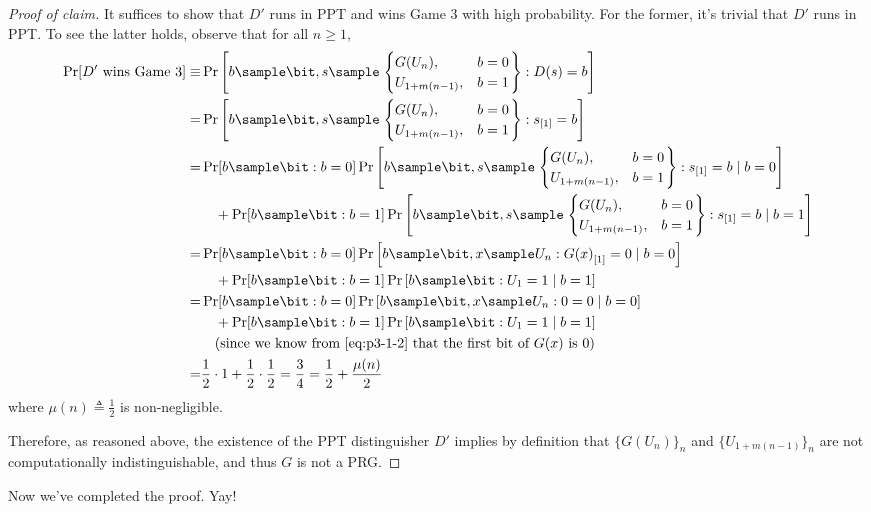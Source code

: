 \begin{answer}[i]
\begin{proof}[Proof of claim]
    It suffices to show that $D'$ runs in PPT and wins Game $3$ with high probability. For the former, it's trivial that $D'$ runs in PPT. To see the latter holds, observe that for all $n\ge 1$,
    \begin{align*}
        \Pr[D' \textrm{ wins Game } 3]
        \equiv& \Pr\left[b\sample\bit, s\sample \left.\begin{cases} 
                G(U_{n}), &b = 0 \\
                U_{1+m(n-1)}, &b = 1 
            \end{cases}\right\} : D(s)=b \right] \\
        =& \Pr\left[b\sample\bit, s\sample \left.\begin{cases} 
                G(U_{n}), &b = 0 \\
                U_{1+m(n-1)}, &b = 1 
            \end{cases}\right\} : s_{[1]}=b \right] \\
        =& \Pr[b\sample\bit: b=0] \Pr\left[b\sample\bit, s\sample \left.\begin{cases} 
                G(U_{n}), &b = 0 \\
                U_{1+m(n-1)}, &b = 1 
            \end{cases}\right\} : s_{[1]}=b \mid b=0 \right] \\
        &\quad + \Pr[b\sample\bit: b=1] \Pr\left[b\sample\bit, s\sample \left.\begin{cases} 
                G(U_{n}), &b = 0 \\
                U_{1+m(n-1)}, &b = 1 
            \end{cases}\right\} : s_{[1]}=b \mid b=1 \right] \\
        =& \Pr[b\sample\bit: b=0] \Pr\left[b\sample\bit, x\sample U_{n} : {G(x)}_{[1]}=0 \mid b=0 \right] \\
        &\quad + \Pr[b\sample\bit: b=1] \Pr\left[b\sample\bit : U_1=1 \mid b=1 \right] \\
        =& \Pr[b\sample\bit: b=0] \Pr\left[b\sample\bit, x\sample U_{n} : 0=0 \mid b=0 \right] \\
        &\quad + \Pr[b\sample\bit: b=1] \Pr\left[b\sample\bit : U_1=1 \mid b=1 \right] \\ 
        &\quad \textrm{(since we know from \eqref{eq:p3-1-2} that the first bit of $G(x)$ is $0$)} \\
        =& \frac{1}{2} \cdot  1 + \frac{1}{2} \cdot \frac{1}{2}
        = \frac{3}{4} = \frac{1}{2}+\frac{\mu(n)}{2}
    \end{align*}
    where $\mu(n)\triangleq \frac{1}{2}$ is non-negligible.

    Therefore, as reasoned above, the existence of the PPT distinguisher $D'$ implies by definition that $\{G(U_n)\}_n$ and $\{U_{1+m(n-1)}\}_n$ are not computationally indistinguishable, and thus $G$ is not a PRG.
\end{proof}

Now we’ve completed the proof. Yay!
\end{answer}



